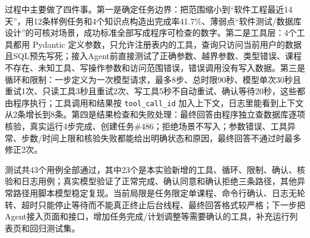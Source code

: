 \documentclass[UTF8,12pt,a4paper]{ctexart}
\begin{document}
过程中主要做了四件事。第一是确定任务边界：把范围缩小到“软件工程最近14天”，用12条样例任务和4个知识点构造出完成率41.7\%、薄弱点“软件测试/数据库设计”的可核对场景，成功标准全部写成程序可检查的数字。第二是工具层：4个工具都用 Pydantic 定义参数，只允许注册表内的工具，查询只访问当前用户的数据且SQL预先写死；接入Agent前直接测试了正确参数、越界参数、类型错误、课程不存在、未知工具、写操作参数和访问范围错误，错误调用没有写入数据。第三是循环和限制：一步定义为一次模型请求，最多8步、总时限90秒、模型单次30秒且重试1次、只读工具3秒且重试2次、写工具5秒不自动重试、确认等待20秒，这些都由程序执行；工具调用和结果按 \texttt{tool\_call\_id} 加入上下文，日志里能看到上下文从2条增长到8条。第四是结果检查和失败处理：最终回答由程序独立查数据库逐项核验，真实运行4步完成、创建任务\#486；拒绝场景不写入；参数错误、工具异常、步数/时间上限和核验失败都能给出明确状态和原因，最终回答不通过时最多修正2次。

测试共43个用例全部通过，其中23个是本实验新增的工具、循环、限制、确认、核验和日志用例；真实模型验证了正常完成、确认同意和确认拒绝三条路径，其他异常路径用脚本模型稳定复现。当前局限是任务限定单课程、命令行确认、日志无轮转、超时只能停止等待而不能真正终止后台线程、最终回答格式较严格；下一步把Agent接入页面和接口，增加任务完成/计划调整等需要确认的工具，补充运行列表页和回归测试集。
\end{document}

